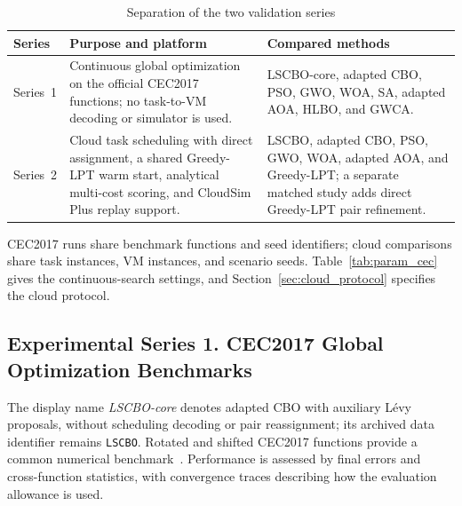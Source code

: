 \documentclass[pdflatex,onecolumn,sn-mathphys-num]{sn-jnl}
\begin{document}
\begin{table}[ht]
\centering
\caption{Separation of the two validation series}\label{tab:series_boundary}
\begin{tabular}{p{} p{} p{}}
\toprule
\textbf{Series} & \textbf{Purpose and platform} & \textbf{Compared methods} \\
\midrule
Series~1 & Continuous global optimization on the official CEC2017 functions; no task-to-VM decoding or simulator is used. & LSCBO-core, adapted CBO, PSO, GWO, WOA, SA, adapted AOA, HLBO, and GWCA. \\
\midrule
Series~2 & Cloud task scheduling with direct assignment, a shared Greedy-LPT warm start, analytical multi-cost scoring, and CloudSim Plus replay support. & LSCBO, adapted CBO, PSO, GWO, WOA, adapted AOA, and Greedy-LPT; a separate matched study adds direct Greedy-LPT pair refinement. \\
\bottomrule
\end{tabular}
\end{table}

CEC2017 runs share benchmark functions and seed identifiers; cloud comparisons share task instances, VM instances, and scenario seeds. Table~\ref{tab:param_cec} gives the continuous-search settings, and Section~\ref{sec:cloud_protocol} specifies the cloud protocol.

\subsection{Experimental Series 1. CEC2017 Global Optimization Benchmarks}\label{sec:cec2017}

The display name \emph{LSCBO-core} denotes adapted CBO with auxiliary L\'{e}vy proposals, without scheduling decoding or pair reassignment; its archived data identifier remains \texttt{LSCBO}. Rotated and shifted CEC2017 functions provide a common numerical benchmark~\cite{Awad2016}. Performance is assessed by final errors and cross-function statistics, with convergence traces describing how the evaluation allowance is used.
\end{document}
